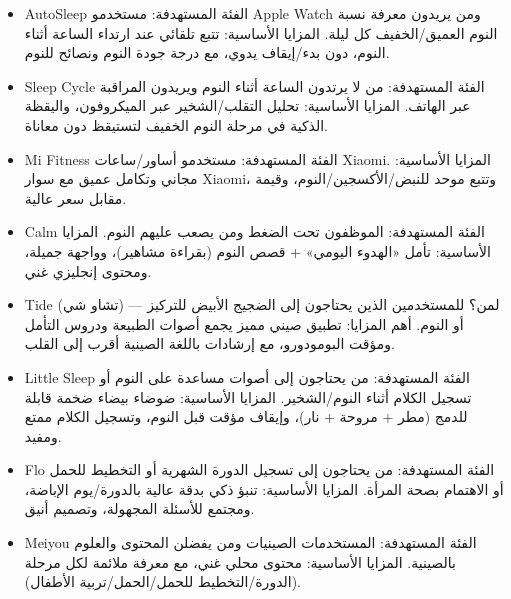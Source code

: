 
\begin{itemize}
  \item AutoSleep الفئة المستهدفة: مستخدمو Apple Watch ومن يريدون معرفة نسبة النوم العميق/الخفيف كل ليلة. المزايا الأساسية: تتبع تلقائي عند ارتداء الساعة أثناء النوم، دون بدء/إيقاف يدوي، مع درجة جودة النوم ونصائح للنوم.
  \item Sleep Cycle الفئة المستهدفة: من لا يرتدون الساعة أثناء النوم ويريدون المراقبة عبر الهاتف. المزايا الأساسية: تحليل التقلب/الشخير عبر الميكروفون، واليقظة الذكية في مرحلة النوم الخفيف لتستيقظ دون معاناة.
  \item Mi Fitness الفئة المستهدفة: مستخدمو أساور/ساعات Xiaomi. المزايا الأساسية: مجاني وتكامل عميق مع سوار Xiaomi، وتتبع موحد للنبض/الأكسجين/النوم، وقيمة مقابل سعر عالية.
\end{itemize}


\begin{itemize}
  \item Calm الفئة المستهدفة: الموظفون تحت الضغط ومن يصعب عليهم النوم. المزايا الأساسية: تأمل «الهدوء اليومي» + قصص النوم (بقراءة مشاهير)، وواجهة جميلة، ومحتوى إنجليزي غني.
  \item Tide (تشاو شي) — لمن؟ للمستخدمين الذين يحتاجون إلى الضجيج الأبيض للتركيز أو النوم. أهم المزايا: تطبيق صيني مميز يجمع أصوات الطبيعة ودروس التأمل ومؤقت البومودورو، مع إرشادات باللغة الصينية أقرب إلى القلب.
  \item Little Sleep الفئة المستهدفة: من يحتاجون إلى أصوات مساعدة على النوم أو تسجيل الكلام أثناء النوم/الشخير. المزايا الأساسية: ضوضاء بيضاء ضخمة قابلة للدمج (مطر + مروحة + نار)، وإيقاف مؤقت قبل النوم، وتسجيل الكلام ممتع ومفيد.
\end{itemize}


\begin{itemize}
  \item Flo الفئة المستهدفة: من يحتاجون إلى تسجيل الدورة الشهرية أو التخطيط للحمل أو الاهتمام بصحة المرأة. المزايا الأساسية: تنبؤ ذكي بدقة عالية بالدورة/يوم الإباضة، ومجتمع للأسئلة المجهولة، وتصميم أنيق.
  \item Meiyou الفئة المستهدفة: المستخدمات الصينيات ومن يفضلن المحتوى والعلوم بالصينية. المزايا الأساسية: محتوى محلي غني، مع معرفة ملائمة لكل مرحلة (الدورة/التخطيط للحمل/الحمل/تربية الأطفال).
\end{itemize}


